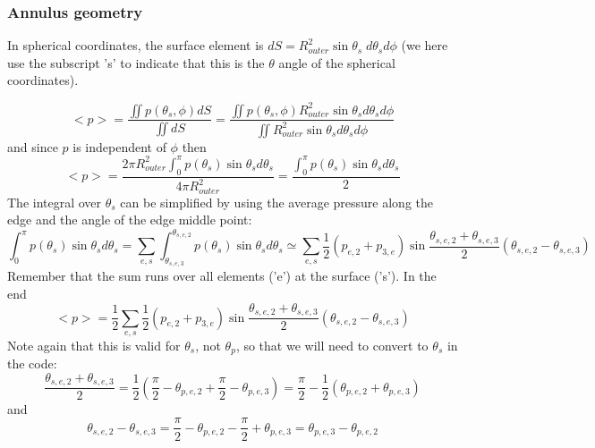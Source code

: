 \documentclass[a4paper,12pt]{article}
\begin{document}
\subsubsection{Annulus geometry}

In spherical coordinates, the surface element is $dS=R_{outer}^2 \sin \theta_s \; d\theta_s d\phi$ 
(we here use the subscript 's' to indicate that this is the $\theta$ angle of the spherical coordinates).

\[
<p> 
= \frac{\iint p(\theta_s,\phi) dS }{\iint dS}
= \frac{\iint p(\theta_s,\phi) R_{outer}^2 \sin \theta_s d\theta_s d\phi}{\iint R_{outer}^2 \sin \theta_s d\theta_s d\phi}
\]
and since $p$ is independent of $\phi$ then 
\[
<p> 
= \frac{ 2\pi R_{outer}^2 \int_0^\pi p(\theta_s)  \sin \theta_s d\theta_s} {4\pi R_{outer}^2}
=\frac{  \int_0^\pi p(\theta_s)  \sin \theta_s d\theta_s} {2}
\]
The integral over $\theta_s$ can be simplified by using the average pressure 
along the edge and the angle of the edge middle point:
\[
\int_0^\pi p(\theta_s) \sin\theta_s d\theta_s 
= \sum_{e,s} \int_{\theta_{s,e,3}}^{\theta_{s,e,2}} p(\theta_s) \sin\theta_s d\theta_s
\simeq \sum_{e,s} \frac12(p_{e,2}+p_{3,e}) \sin \frac{\theta_{s,e,2}+\theta_{s,e,3} }{2} (\theta_{s,e,2} -\theta_{s,e,3} )
\]
Remember that the sum runs over all elements ('e') at the surface ('s').
In the end
\[
<p> = \frac12 \sum_{e,s}  \frac12(p_{e,2}+p_{3,e}) \sin \frac{\theta_{s,e,2}+\theta_{s,e,3} }{2} (\theta_{s,e,2} -\theta_{s,e,3} )
\]
Note again that this is valid for $\theta_s$, not $\theta_p$, so that we will need to convert to $\theta_s$ in the 
code:
\[
\frac{\theta_{s,e,2}+\theta_{s,e,3} }{2} 
= \frac12 ( \frac{\pi}{2} - \theta_{p,e,2} + \frac{\pi}{2} - \theta_{p,e,3}  )
= \frac{\pi}{2} - \frac{1}{2} ( \theta_{p,e,2} +  \theta_{p,e,3}  )
\]
and 
\[
\theta_{s,e,2} -\theta_{s,e,3} 
= \frac{\pi}{2} - \theta_{p,e,2} - \frac{\pi}{2} + \theta_{p,e,3}
= \theta_{p,e,3} - \theta_{p,e,2}
\]


\end{document}
